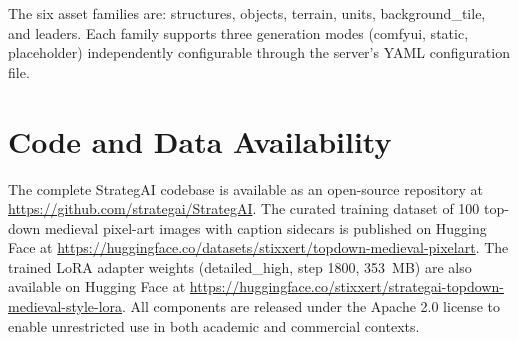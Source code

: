 \documentclass[conference]{IEEEtran}
\begin{document}
The six asset families are: structures, objects, terrain, units, background\_tile, and leaders. Each family supports three generation modes (comfyui, static, placeholder) independently configurable through the server's YAML configuration file.

\section{Code and Data Availability}
\label{app:code}

The complete StrategAI codebase is available as an open-source repository at \url{https://github.com/strategai/StrategAI}. The curated training dataset of 100 top-down medieval pixel-art images with caption sidecars is published on Hugging Face at \url{https://huggingface.co/datasets/stixxert/topdown-medieval-pixelart}. The trained LoRA adapter weights (detailed\_high, step 1800, 353~MB) are also available on Hugging Face at \url{https://huggingface.co/stixxert/strategai-topdown-medieval-style-lora}. All components are released under the Apache 2.0 license to enable unrestricted use in both academic and commercial contexts.
\end{document}
